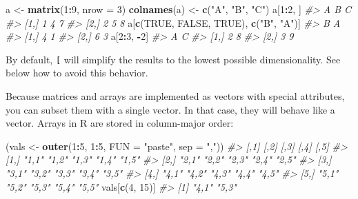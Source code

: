 \documentclass[]{book}
\newenvironment{Shaded}{\begin{snugshade}}{\end{snugshade}}
\newcommand{\KeywordTok}[1]{\textcolor[rgb]{0.13,0.29,0.53}{\textbf{#1}}}
\newcommand{\DataTypeTok}[1]{\textcolor[rgb]{0.13,0.29,0.53}{#1}}
\newcommand{\DecValTok}[1]{\textcolor[rgb]{0.00,0.00,0.81}{#1}}
\newcommand{\StringTok}[1]{\textcolor[rgb]{0.31,0.60,0.02}{#1}}
\newcommand{\CommentTok}[1]{\textcolor[rgb]{0.56,0.35,0.01}{\textit{#1}}}
\newcommand{\OtherTok}[1]{\textcolor[rgb]{0.56,0.35,0.01}{#1}}
\newcommand{\OperatorTok}[1]{\textcolor[rgb]{0.81,0.36,0.00}{\textbf{#1}}}
\newcommand{\NormalTok}[1]{#1}
\theoremstyle{definition}
\theoremstyle{definition}
\theoremstyle{definition}
\theoremstyle{remark}
\begin{document}
\begin{Shaded}
\begin{Highlighting}[]
\NormalTok{a <-}\StringTok{ }\KeywordTok{matrix}\NormalTok{(}\DecValTok{1}\OperatorTok{:}\DecValTok{9}\NormalTok{, }\DataTypeTok{nrow =} \DecValTok{3}\NormalTok{)}
\KeywordTok{colnames}\NormalTok{(a) <-}\StringTok{ }\KeywordTok{c}\NormalTok{(}\StringTok{"A"}\NormalTok{, }\StringTok{"B"}\NormalTok{, }\StringTok{"C"}\NormalTok{)}
\NormalTok{a[}\DecValTok{1}\OperatorTok{:}\DecValTok{2}\NormalTok{, ]}
\CommentTok{#>      A B C}
\CommentTok{#> [1,] 1 4 7}
\CommentTok{#> [2,] 2 5 8}
\NormalTok{a[}\KeywordTok{c}\NormalTok{(}\OtherTok{TRUE}\NormalTok{, }\OtherTok{FALSE}\NormalTok{, }\OtherTok{TRUE}\NormalTok{), }\KeywordTok{c}\NormalTok{(}\StringTok{"B"}\NormalTok{, }\StringTok{"A"}\NormalTok{)]}
\CommentTok{#>      B A}
\CommentTok{#> [1,] 4 1}
\CommentTok{#> [2,] 6 3}
\NormalTok{a[}\DecValTok{2}\OperatorTok{:}\DecValTok{3}\NormalTok{, }\OperatorTok{-}\DecValTok{2}\NormalTok{]}
\CommentTok{#>      A C}
\CommentTok{#> [1,] 2 8}
\CommentTok{#> [2,] 3 9}
\end{Highlighting}
\end{Shaded}

By default, \texttt{{[}} will simplify the results to the lowest
possible dimensionality. See below how to avoid this behavior.

Because matrices and arrays are implemented as vectors with special
attributes, you can subset them with a single vector. In that case, they
will behave like a vector. Arrays in R are stored in column-major order:

\begin{Shaded}
\begin{Highlighting}[]
\NormalTok{(vals <-}\StringTok{ }\KeywordTok{outer}\NormalTok{(}\DecValTok{1}\OperatorTok{:}\DecValTok{5}\NormalTok{, }\DecValTok{1}\OperatorTok{:}\DecValTok{5}\NormalTok{, }\DataTypeTok{FUN =} \StringTok{"paste"}\NormalTok{, }\DataTypeTok{sep =} \StringTok{","}\NormalTok{))}
\CommentTok{#>      [,1]  [,2]  [,3]  [,4]  [,5] }
\CommentTok{#> [1,] "1,1" "1,2" "1,3" "1,4" "1,5"}
\CommentTok{#> [2,] "2,1" "2,2" "2,3" "2,4" "2,5"}
\CommentTok{#> [3,] "3,1" "3,2" "3,3" "3,4" "3,5"}
\CommentTok{#> [4,] "4,1" "4,2" "4,3" "4,4" "4,5"}
\CommentTok{#> [5,] "5,1" "5,2" "5,3" "5,4" "5,5"}
\NormalTok{vals[}\KeywordTok{c}\NormalTok{(}\DecValTok{4}\NormalTok{, }\DecValTok{15}\NormalTok{)]}
\CommentTok{#> [1] "4,1" "5,3"}
\end{Highlighting}
\end{Shaded}
\end{document}
